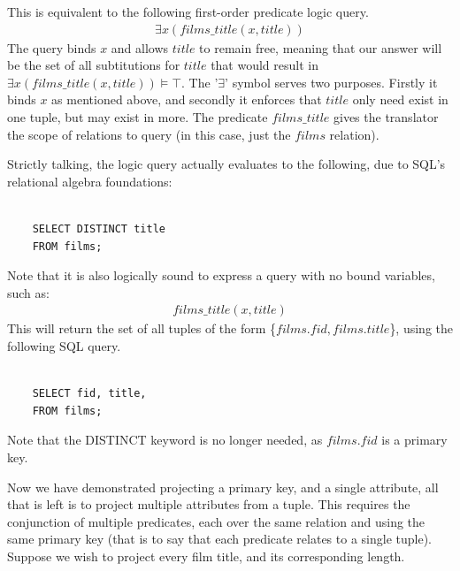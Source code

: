 \documentclass[a4paper, 11pt]{article}
\begin{document}
    This is equivalent to the following first-order predicate logic query.
    \begin{gather}
      \exists x(films\_title(x, title)) \label{select1}
    \end{gather}
    The query binds $x$ and allows $title$ to remain free, meaning that our
    answer will be the set of all subtitutions for $title$ that would result in
    $\exists x(films\_title(x, title)) \models \top$. The '$\exists$' symbol
    serves two purposes. Firstly it binds $x$ as mentioned above, and secondly
    it enforces that $title$ only need exist in one tuple, but may exist in
    more. The predicate $films\_title$ gives the translator the scope of
    relations to query (in this case, just the $films$ relation).

    Strictly talking, the logic query actually evaluates to the following, due
    to SQL's relational algebra foundations:


    \begin{verbatim}

    SELECT DISTINCT title
    FROM films;

    \end{verbatim}


    Note that it is also logically sound to express a query with no bound
    variables, such as:
    \begin{gather}
      films\_title(x, title) \label{select2}
    \end{gather}
    This will return the set of all tuples of the form \{$films.fid,
    films.title$\}, using the following SQL query.

    \begin{verbatim}

    SELECT fid, title,
    FROM films;

    \end{verbatim}

    Note that the DISTINCT keyword is no longer needed, as $films.fid$ is a
    primary key.

    Now we have demonstrated projecting a primary key, and a single attribute,
    all that is left is to project multiple attributes from a tuple. This
    requires the conjunction of multiple predicates, each over the same
    relation and using the same primary key (that is to say that each predicate
    relates to a single tuple). Suppose we wish to project
    every film title, and its corresponding length.
\end{document}
